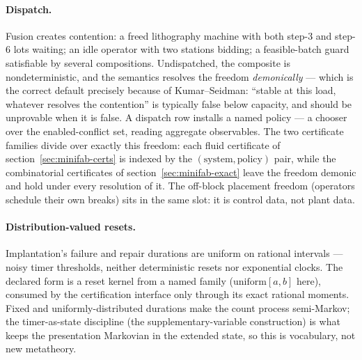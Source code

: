 \paragraph{Dispatch.} Fusion creates contention: a freed lithography
machine with both step-3 and step-6 lots waiting; an idle operator
with two stations bidding; a feasible-batch guard satisfiable by
several compositions. Undispatched, the composite is
nondeterministic, and the semantics resolves the freedom
\emph{demonically} --- which is the correct default precisely because
of Kumar--Seidman: ``stable at this load, whatever resolves the
contention'' is typically false below capacity, and should be
unprovable when it is false. A dispatch row installs a named policy
--- a chooser over the enabled-conflict set, reading aggregate
observables. The two certificate families divide over exactly this
freedom: each fluid certificate of section~\ref{sec:minifab-certs}
is indexed by the $(\text{system}, \text{policy})$ pair, while the
combinatorial certificates of section~\ref{sec:minifab-exact} leave
the freedom demonic and hold under every resolution of it. The off-block
placement freedom (operators schedule their own breaks) sits in the
same slot: it is control data, not plant data.

\paragraph{Distribution-valued resets.} Implantation's failure and
repair durations are uniform on rational intervals --- noisy timer
thresholds, neither deterministic resets nor exponential clocks. The
declared form is a reset kernel from a named family
($\mathrm{uniform}[a,b]$ here), consumed by the certification
interface only through its exact rational moments. Fixed and
uniformly-distributed durations make the count process semi-Markov;
the timer-as-state discipline (the supplementary-variable
construction) is what keeps the presentation Markovian in the
extended state, so this is vocabulary, not new metatheory.

